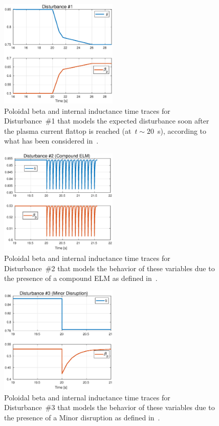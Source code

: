 	\begin{figure}[h]
	\centering
	\includegraphics[width=0.5\textwidth]{Chp3/Dist_1_Urano.eps}
	\caption{Poloidal beta and internal inductance time traces for Disturbance~\#1 that models the expected disturbance soon after the plasma current flattop is reached (at~$t\sim 20 $~s), according to what has been considered in~\cite{urano2015development}.	\label{Urano} }
\end{figure}

	\begin{figure}[h]
	\centering
	\includegraphics[width=0.5\textwidth]{Chp3/Dist_2_cmp_ELM.eps}
	\caption{Poloidal beta and internal inductance time traces for Disturbance~\#2 that models the behavior of these variables due to the presence of a compound ELM as defined in~\cite{JT60SA:PID}.	\label{cmpELM} }
\end{figure}


\begin{figure}[h]
	\centering
	\includegraphics[width=0.5\textwidth]{Chp3/Dist_3_minor.eps}
	\caption{Poloidal beta and internal inductance time traces for Disturbance~\#3 that models the behavior of these variables due to the presence of a Minor disruption as defined in~\cite{JT60SA:PID}.	\label{MnrDisrp} }
\end{figure}



